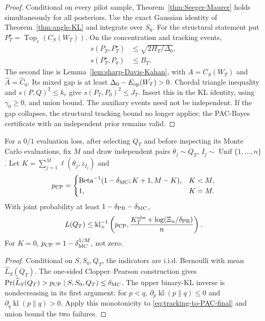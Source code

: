 \begin{proof}
Conditional on every pilot sample, Theorem~\ref{thm:Seeger-Maurer} holds
simultaneously for all posteriors. Use the exact Gaussian identity of
Theorem~\ref{thm:angle-KL} and integrate over $S_0$.
For the structural statement put
$P_T^\star=\operatorname{Top}_r(C_S(W_T))$. On the concentration and
tracking events,
\begin{align}
 s(P_T,P_T^\star)&\le\sqrt{2H_T/\Delta_0},\\
 s(P_T^\star,P_0)&\le B_T.
\end{align}
The second line is Lemma~\ref{lem:sharp-Davis-Kahan}, with $A=C_S(W_T)$
and $\widehat A=\widehat C_0$. Its mixed gap is at least
$\Delta_0-E_{\rm op}(W_T)>0$. Chordal triangle inequality and
$s(P,Q)^2\le k_r$ give $s(P_T,P_0)^2\le J_T$.
Insert this in the KL identity, using $\gamma_0\ge0$, and union bound.
The auxiliary events need not be independent. If the gap collapses, the
structural tracking bound no longer applies; the PAC-Bayes certificate
with an independent prior remains valid.
\end{proof}

\begin{corollary}
\label{cor:CP-Gibbs}
For a $0/1$ evaluation loss, after selecting $Q_T$ and before inspecting
its Monte Carlo evaluations, fix $M$ and draw independent pairs
$\theta_j\sim Q_T$, $I_j\sim\operatorname{Unif}\{1,\ldots,n\}$.
Let $K=\sum_{j=1}^M\ell(\theta_j,z_{I_j})$ and
\begin{equation}
 p_{\rm CP}=
 \begin{cases}
 \operatorname{Beta}^{-1}(1-\delta_{\rm MC};K+1,M-K),&K<M,\\
 1,&K=M.
 \end{cases}
\end{equation}
With joint probability at least $1-\delta_{\rm PB}-\delta_{\rm MC}$,
\begin{equation}
 L(Q_T)\le\operatorname{kl}^{-1}_+\left(p_{\rm CP},
             \frac{K_T^{\rm obs}+\log(\Xi_n/\delta_{\rm PB})}{n}\right).
 \label{eq:CP-PAC-certificate}
\end{equation}
For $K=0$, $p_{\rm CP}=1-\delta_{\rm MC}^{1/M}$, not zero.
\end{corollary}
\begin{proof}
Conditional on $S,S_0,Q_T$, the indicators are i.i.d. Bernoulli with mean
$\widehat L_S(Q_T)$. The one-sided Clopper--Pearson construction
\cite{clopper1934confidence} gives
$\Pr(\widehat L_S(Q_T)>p_{\rm CP}\mid S,S_0,Q_T)\le\delta_{\rm MC}$.
The upper binary-KL inverse is nondecreasing in its first argument:
for $p<q$, $\partial_p\operatorname{kl}(p\|q)\le0$ and
$\partial_q\operatorname{kl}(p\|q)>0$. Apply this monotonicity to
\eqref{eq:tracking-to-PAC-final} and union bound the two failures.
\end{proof}

